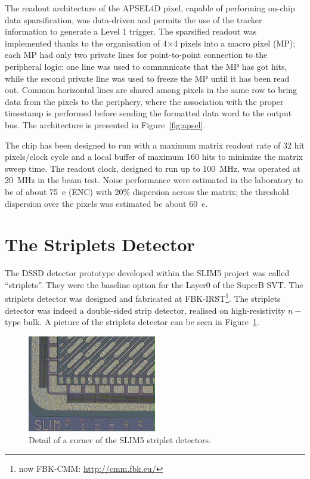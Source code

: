 The readout architecture of the APSEL4D pixel, capable of performing on-chip data sparsification, was 
data-driven and permits the use of the tracker information to generate a Level 1 trigger. 
The sparsified readout was implemented thanks to the organisation of 4$\times$4 pixels into a macro 
pixel (MP); each MP had only two private lines for point-to-point connection to the peripheral logic:
one line was used to communicate that the MP has got hits, while the second private line was used to 
freeze the MP until it has been read out.  Common horizontal lines are shared among pixels in the 
same row to bring data from the pixels to the periphery, where the association with the proper 
timestamp is performed before sending the formatted data word to the output bus. The architecture is 
presented in Figure~\ref{fig:apsel}.

The chip has been designed to run with a maximum matrix readout rate of 32 hit pixels/clock cycle and 
a local buffer of maximum 160 hits to minimize the matrix sweep time.
The readout clock, designed to run up to 100~MHz, was operated at 20~MHz in the beam test.
Noise performance were estimated in the laboratory to be of about 75~e (ENC) with 20\% dispersion 
across the matrix; the threshold dispersion over the pixels was estimated be about 60~e.

\section{The Striplets Detector}
\label{sec:Striplets}

The DSSD detector prototype  developed within the SLIM5 project was called ``striplets''. They 
were the baseline option for the Layer0 of the SuperB SVT.
The striplets detector was designed and fabricated at FBK-IRST\footnote{now FBK-CMM: \url{http://cmm.fbk.eu/}}.
The striplets detector was indeed a double-sided strip detector, realised on high-resistivity 
$n-$type bulk. A picture of the striplets detector can be seen in Figure~\ref{fig:striplets}.

\begin{figure}[!htpb]
\centering
\includegraphics[width=0.5\textwidth]{striplets.jpg}
\caption{\label{fig:striplets} Detail of a corner of the SLIM5 striplet detectors.}
\end{figure}


